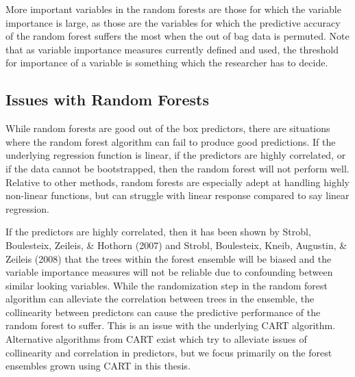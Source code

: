 \documentclass[12pt,twoside]{reedthesis}
\theoremstyle{definition}
\theoremstyle{definition}
\theoremstyle{definition}
\theoremstyle{remark}
\begin{document}
More important variables in the random forests are those for which the
variable importance is large, as those are the variables for which the
predictive accuracy of the random forest suffers the most when the out
of bag data is permuted. Note that as variable importance measures
currently defined and used, the threshold for importance of a variable
is something which the researcher has to decide. \par

\subsection{Issues with Random
Forests}\label{issues-with-random-forests}

While random forests are good out of the box predictors, there are
situations where the random forest algorithm can fail to produce good
predictions. If the underlying regression function is linear, if the
predictors are highly correlated, or if the data cannot be bootstrapped,
then the random forest will not perform well. Relative to other methods,
random forests are especially adept at handling highly non-linear
functions, but can struggle with linear response compared to say linear
regression. \par

If the predictors are highly correlated, then it has been shown by
Strobl, Boulesteix, Zeileis, \& Hothorn (2007) and Strobl, Boulesteix,
Kneib, Augustin, \& Zeileis (2008) that the trees within the forest
ensemble will be biased and the variable importance measures will not be
reliable due to confounding between similar looking variables. While the
randomization step in the random forest algorithm can alleviate the
correlation between trees in the ensemble, the collinearity between
predictors can cause the predictive performance of the random forest to
suffer. This is an issue with the underlying CART algorithm. Alternative
algorithms from CART exist which try to alleviate issues of collinearity
and correlation in predictors, but we focus primarily on the forest
ensembles grown using CART in this thesis. \par
\end{document}
